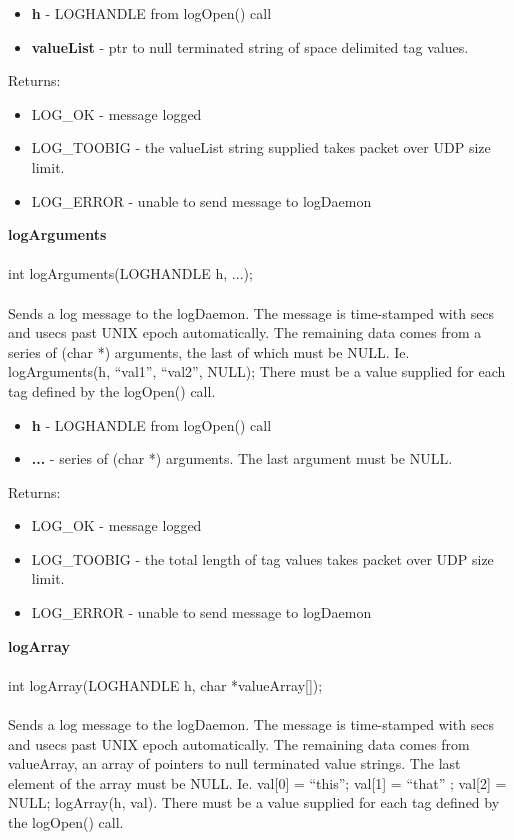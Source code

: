 \documentclass[11pt]{article}
\begin{document}
\begin{itemize}
\item {\bf h} - LOGHANDLE from logOpen() call
\item {\bf valueList} - ptr to null terminated string of space delimited tag values.
\end{itemize}
Returns:

\begin{itemize}
\item LOG\_OK - message logged
\item LOG\_TOOBIG - the valueList string supplied takes packet over UDP size limit.
\item LOG\_ERROR - unable to send message to logDaemon
\end{itemize}
{\bf logArguments}\\
\\
int logArguments(LOGHANDLE h, ...);\\
\\
Sends a log message to the logDaemon. The message is time-stamped with secs and usecs past UNIX epoch automatically. The remaining data comes from a series of (char *) arguments, the last of which must be NULL. Ie. logArguments(h, ``val1'', ``val2'', NULL); There must be a value supplied for each tag defined by the logOpen() call.

\begin{itemize}
\item {\bf h} - LOGHANDLE from logOpen() call
\item {\bf ...} - series of (char *) arguments. The last argument must be NULL.
\end{itemize}
Returns:

\begin{itemize}
\item LOG\_OK - message logged
\item LOG\_TOOBIG - the total length of tag values takes packet over UDP size limit.
\item LOG\_ERROR - unable to send message to logDaemon
\end{itemize}
{\bf logArray}\\
\\
int logArray(LOGHANDLE h, char *valueArray[]);\\
\\
Sends a log message to the logDaemon. The message is time-stamped with secs and usecs past UNIX epoch automatically. The remaining data comes from valueArray, an array of pointers to null terminated value strings. The last element of the array must be NULL. Ie. val[0] = ``this''; val[1] = ``that'' ; val[2] = NULL; logArray(h, val). There must be a value supplied for each tag defined by the logOpen() call.
\end{document}
